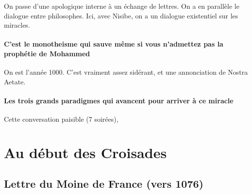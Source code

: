 \begin{Synthesis}
On passe d'une apologique interne à un échange de lettres.
On a en parallèle le dialogue entre philosophes.
Ici, avec Nisibe, on a un dialogue existentiel sur les miracles.
\end{Synthesis}


\paragraph{C'est le monotheisme qui sauve même si vous n'admettez pas la prophétie de Mohammed} On est l'année 1000. C'est vraiment assez sidérant, et une annonciation de Nostra Aetate.

\paragraph{Les trois grands paradigmes qui avancent pour arriver à ce miracle} Cette conversation paisible (7 soirées), 


\section{Au début des Croisades}

\subsection{Lettre du Moine de France (vers 1076)}

